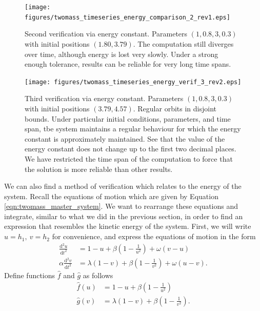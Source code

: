 \begin{figure}[h!]
    \centering
    \texttt{[image: figures/twomass\_timeseries\_energy\_comparison\_2\_rev1.eps]}
    \caption{
        Second verification via energy constant.
        Parameters \((1, 0.8, 3, 0.3)\) with initial positions \((1.80, 3.79)\).
        The computation still diverges over time,
        although energy is lost very slowly.
        Under a strong enough tolerance, results can be reliable for very long time spans.
    }
    \label{fig:twomass_energy_2}  %
\end{figure}

\begin{figure}[h!]
    \centering
    \texttt{[image: figures/twomass\_timeseries\_energy\_verif\_3\_rev2.eps]}
    \caption{
        Third verification via energy constant.
        Parameters \((1, 0.8, 3, 0.3)\) with initial positions \((3.79, 4.57)\).
        Regular orbits in disjoint bounds.
        Under particular initial conditions, parameters, and time span,
        tbe system maintains a regular behaviour for which the energy constant is approximately maintained.
        See that the value of the energy constant does not change up to the first two decimal places.
        We have restricted the time span of the computation to force that the solution is more reliable than other results.
    }
    \label{fig:twomass_energy_3}
\end{figure}
We can also find a method of verification which relates to the energy of the system.
Recall the equations of motion which are given by Equation \ref{eqn:twomass_master_system}.
We want to rearrange these equations and integrate, similar to what we did in the previous section, in order to find an expression that resembles the kinetic energy of the system.
First, we will write \(u = h_1,~v=h_2\) for convenience, and express the equations of motion in the form
\begin{align*}
    \frac{\mathrm{d}^2 u}{\mathrm{d}t^2} &= 1 - u + \beta\left(1-\frac{1}{u^2}\right) + \omega(v-u) \\
    \alpha\frac{\mathrm{d}^2 v}{\mathrm{d}t^2} &= \lambda(1 - v) + \beta\left(1-\frac{1}{v^2}\right) + \omega(u-v).
\end{align*}
Define functions $\hat{f}$ and $\hat{g}$ as follows
\begin{align*}
    \hat{f}(u) &= 1-u + \beta\left(1-\frac{1}{u^2}\right) \\
    \hat{g}(v) &= \lambda(1-v) + \beta\left( 1-\frac{1}{v^2} \right).
\end{align*}

